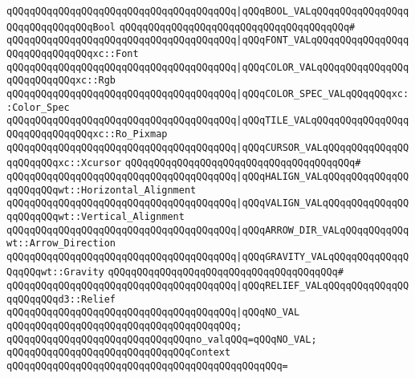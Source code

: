 \verb|qQQqqQQqqQQqqQQqqQQqqQQqqQQqqQQqqQQqqQQq|\verb#|qQQqBOOL_VALqQQqqQQqqQQqqQQqqQQqqQQqqQQqqQQqBool#\newline
\verb|qQQqqQQqqQQqqQQqqQQqqQQqqQQqqQQqqQQqqQQq#|\newline
\verb|qQQqqQQqqQQqqQQqqQQqqQQqqQQqqQQqqQQqqQQq|\verb#|qQQqFONT_VALqQQqqQQqqQQqqQQqqQQqqQQqqQQqqQQqxc::Font#\newline
\verb|qQQqqQQqqQQqqQQqqQQqqQQqqQQqqQQqqQQqqQQq|\verb#|qQQqCOLOR_VALqQQqqQQqqQQqqQQqqQQqqQQqqQQqxc::Rgb#\newline
\verb|qQQqqQQqqQQqqQQqqQQqqQQqqQQqqQQqqQQqqQQq|\verb#|qQQqCOLOR_SPEC_VALqQQqqQQqxc::Color_Spec#\newline
\verb|qQQqqQQqqQQqqQQqqQQqqQQqqQQqqQQqqQQqqQQq|\verb#|qQQqTILE_VALqQQqqQQqqQQqqQQqqQQqqQQqqQQqqQQqxc::Ro_Pixmap#\newline
\verb|qQQqqQQqqQQqqQQqqQQqqQQqqQQqqQQqqQQqqQQq|\verb#|qQQqCURSOR_VALqQQqqQQqqQQqqQQqqQQqqQQqxc::Xcursor#\newline
\verb|qQQqqQQqqQQqqQQqqQQqqQQqqQQqqQQqqQQqqQQq#|\newline
\verb|qQQqqQQqqQQqqQQqqQQqqQQqqQQqqQQqqQQqqQQq|\verb#|qQQqHALIGN_VALqQQqqQQqqQQqqQQqqQQqqQQqwt::Horizontal_Alignment#\newline
\verb|qQQqqQQqqQQqqQQqqQQqqQQqqQQqqQQqqQQqqQQq|\verb#|qQQqVALIGN_VALqQQqqQQqqQQqqQQqqQQqqQQqwt::Vertical_Alignment#\newline
\verb|qQQqqQQqqQQqqQQqqQQqqQQqqQQqqQQqqQQqqQQq|\verb#|qQQqARROW_DIR_VALqQQqqQQqqQQqwt::Arrow_Direction#\newline
\verb|qQQqqQQqqQQqqQQqqQQqqQQqqQQqqQQqqQQqqQQq|\verb#|qQQqGRAVITY_VALqQQqqQQqqQQqqQQqqQQqwt::Gravity#\newline
\verb|qQQqqQQqqQQqqQQqqQQqqQQqqQQqqQQqqQQqqQQq#|\newline
\verb|qQQqqQQqqQQqqQQqqQQqqQQqqQQqqQQqqQQqqQQq|\verb#|qQQqRELIEF_VALqQQqqQQqqQQqqQQqqQQqqQQqd3::Relief#\newline
\verb|qQQqqQQqqQQqqQQqqQQqqQQqqQQqqQQqqQQqqQQq|\verb#|qQQqNO_VAL#\newline
\verb|qQQqqQQqqQQqqQQqqQQqqQQqqQQqqQQqqQQqqQQq;|\newline
\newline
\verb|qQQqqQQqqQQqqQQqqQQqqQQqqQQqqQQqno_valqQQq=qQQqNO_VAL;|\newline
\newline
\verb|qQQqqQQqqQQqqQQqqQQqqQQqqQQqqQQqContext|\newline
\verb|qQQqqQQqqQQqqQQqqQQqqQQqqQQqqQQqqQQqqQQqqQQqqQQq=|\newline
